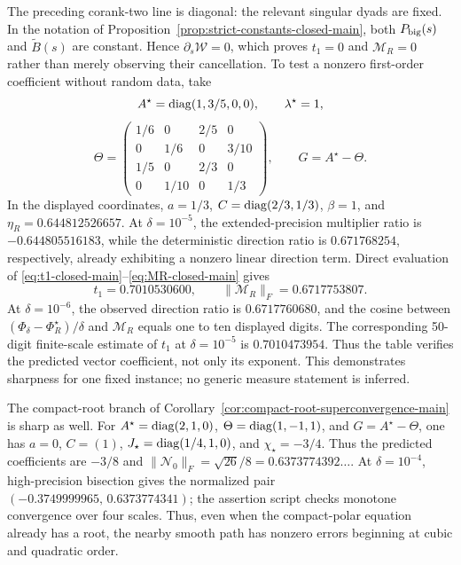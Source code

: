 The preceding corank-two line is diagonal: the relevant singular dyads are
fixed.  In the notation of Proposition~\ref{prop:strict-constants-closed-main},
both \(P_{\rm big}(s)\) and \(\widetilde B(s)\) are constant.  Hence
\(\partial_s\mathcal W=0\), which proves \(t_1=0\) and
\(\mathcal M_R=0\) rather than merely observing their cancellation.  To test a nonzero first-order
coefficient without random data, take
\[
 A^\star=\operatorname{diag}(1,3/5,0,0),\qquad \lambda^\star=1,
\]
\[
 \Theta=
 \begin{pmatrix}
  1/6&0&2/5&0\\
  0&1/6&0&3/10\\
  1/5&0&2/3&0\\
  0&1/10&0&1/3
 \end{pmatrix},
 \qquad G=A^\star-\Theta.
\]
In the displayed coordinates, \(a=1/3\),
\(C=\operatorname{diag}(2/3,1/3)\), \(\beta=1\), and
\(\eta_R=0.644812526657\).  At \(\delta=10^{-5}\), the extended-precision
multiplier ratio is \(-0.644805516183\), while the deterministic direction
ratio is \(0.671768254\),
respectively, already exhibiting a nonzero linear direction term.  Direct evaluation of
\eqref{eq:t1-closed-main}--\eqref{eq:MR-closed-main} gives
\[
 t_1=0.7010530600,
 \qquad \|\mathcal M_R\|_F=0.6717753807.
\]
At \(\delta=10^{-6}\), the observed direction ratio is
\(0.6717760680\), and the cosine between
\((\Phi_\delta-\Phi_R^\star)/\delta\) and \(\mathcal M_R\) equals one to
ten displayed digits.  The corresponding 50-digit finite-scale estimate of
\(t_1\) at \(\delta=10^{-5}\) is \(0.7010473954\).  Thus the table verifies the
predicted vector coefficient, not only its exponent.  This demonstrates
sharpness for one fixed instance; no generic measure statement is inferred.

The compact-root branch of
Corollary~\ref{cor:compact-root-superconvergence-main} is sharp as well.
For \(A^\star=\operatorname{diag}(2,1,0)\), \(\Theta=\operatorname{diag}(1,-1,1)\), and
\(G=A^\star-\Theta\), one has \(a=0\), \(C=(1)\),
\(J_\star=\operatorname{diag}(1/4,1,0)\), and \(\chi_\star=-3/4\).  Thus the predicted
coefficients are \(-3/8\) and
\(\|\mathcal N_0\|_F=\sqrt{26}/8=0.6373774392\ldots\).
At \(\delta=10^{-4}\), high-precision bisection gives the normalized pair
\((-0.3749999965,\,0.6373774341)\); the assertion script checks monotone
convergence over four scales.  Thus, even when the compact-polar equation
already has a root, the nearby smooth path has nonzero errors beginning at
cubic and quadratic order.

